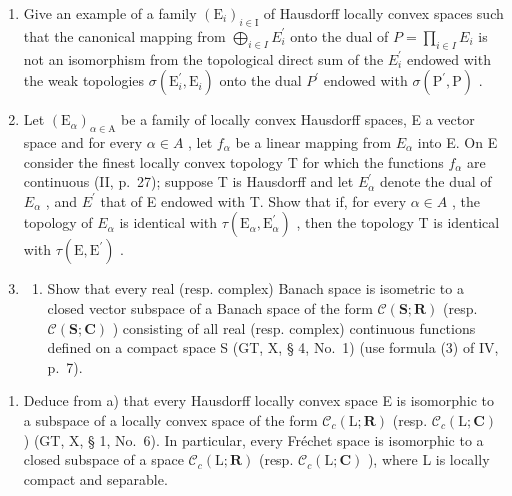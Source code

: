 \begin{enumerate}
\def\labelenumi{\arabic{enumi})}
\setcounter{enumi}{22}
\item
  Give an example of a family \((\mathrm{E}_{i})_{i\in\mathrm{I}}\) of Hausdorff locally convex spaces such that the canonical mapping from \(\bigoplus_{i\in I} E_{i}^{\prime}\) onto the dual of \(P = \prod_{i\in I} E_{i}\) is not an isomorphism from the topological direct sum of the \(E_{i}^{\prime}\) endowed with the weak topologies \(\sigma(\mathrm{E}_{i}^{\prime}, \mathrm{E}_{i})\) onto the dual \(P^{\prime}\) endowed with \(\sigma(\mathrm{P}^{\prime}, \mathrm{P})\) .
\item
  Let \((\mathrm{E}_{\alpha})_{\alpha\in\mathrm{A}}\) be a family of locally convex Hausdorff spaces, E a vector space and for every \(\alpha\in A\) , let \(f_{\alpha}\) be a linear mapping from \(E_{\alpha}\) into E. On E consider the finest locally convex topology T for which the functions \(f_{\alpha}\) are continuous (II, p.~27); suppose T is Hausdorff and let \(E_{\alpha}^{\prime}\) denote the dual of \(E_{\alpha}\) , and \(E^{\prime}\) that of E endowed with T. Show that if, for every \(\alpha\in A\) , the topology of \(E_{\alpha}\) is identical with \(\tau(\mathrm{E}_{\alpha},\mathrm{E}_{\alpha}^{\prime})\) , then the topology T is identical with \(\tau(\mathrm{E},\mathrm{E}^{\prime})\) .
\item
  \begin{enumerate}
  \def\labelenumii{\alph{enumii})}
  \tightlist
  \item
    Show that every real (resp. complex) Banach space is isometric to a closed vector subspace of a Banach space of the form \(\mathcal{C}(\mathbf{S};\mathbf{R})\) (resp. \(\mathcal{C}(\mathbf{S};\mathbf{C})\) ) consisting of all real (resp. complex) continuous functions defined on a compact space S (GT, X, § 4, No.~1) (use formula (3) of IV, p.~7).
  \end{enumerate}
\end{enumerate}

\begin{enumerate}
\def\labelenumi{\alph{enumi})}
\setcounter{enumi}{1}
\tightlist
\item
  Deduce from a) that every Hausdorff locally convex space E is isomorphic to a subspace of a locally convex space of the form \(\mathcal{C}_{c}(\mathrm{L};\mathbf{R})\) (resp. \(\mathcal{C}_{c}(\mathrm{L};\mathbf{C})\) ) (GT, X, § 1, No.~6). In particular, every Fréchet space is isomorphic to a closed subspace of a space \(\mathcal{C}_{c}(\mathrm{L};\mathbf{R})\) (resp. \(\mathcal{C}_{c}(\mathrm{L};\mathbf{C})\) ), where L is locally compact and separable.
\end{enumerate}
\relax{}
